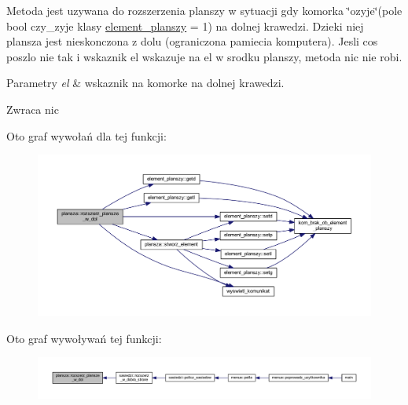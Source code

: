 Metoda jest uzywana do rozszerzenia planszy w sytuacji gdy komorka \char`\"{}ozyje\char`\"{}(pole bool czy\+\_\+zyje klasy \mbox{\hyperlink{classelement__planszy}{element\+\_\+planszy}} = 1) na dolnej krawedzi. Dzieki niej plansza jest nieskonczona z dolu (ograniczona pamiecia komputera). Jesli cos poszlo nie tak i wskaznik el wskazuje na el w srodku planszy, metoda nic nie robi. 
\begin{DoxyParams}{Parametry}
{\em el} & wskaznik na komorke na dolnej krawedzi. \\
\hline
\end{DoxyParams}
\begin{DoxyReturn}{Zwraca}
nic 
\end{DoxyReturn}
Oto graf wywołań dla tej funkcji\+:
\nopagebreak
\begin{figure}[H]
\begin{center}
\leavevmode
\includegraphics[width=350pt]{classplansza_a6b7712b23870fbe508d00e68a740e853_cgraph}
\end{center}
\end{figure}
Oto graf wywoływań tej funkcji\+:
\nopagebreak
\begin{figure}[H]
\begin{center}
\leavevmode
\includegraphics[width=350pt]{classplansza_a6b7712b23870fbe508d00e68a740e853_icgraph}
\end{center}
\end{figure}
\mbox{\label{classplansza_a47bf5f6dea6fad229b9c525638077df8}} 
